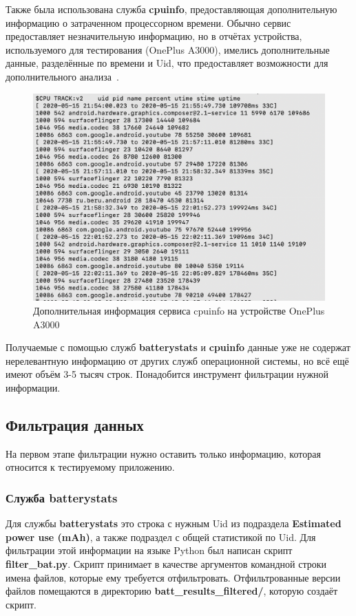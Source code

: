 \documentclass[a4paper,14pt]{extarticle} %
\begin{document}
	Также была использована служба \textbf{cpuinfo}, предоставляющая дополнительную информацию о затраченном процессорном времени. Обычно сервис предоставляет незначительную информацию, но в отчётах устройства, используемого для тестирования (OnePlus A3000), имелись дополнительные данные, разделённые по времени и Uid, что предоставляет возможности для дополнительного анализа~\ris{\ref{fig:cpuinfo}}.
	
	\begin{figure}[H]
		\includegraphics[width=\textwidth]{cpuinfo}
		\caption{Дополнительная информация сервиса cpuinfo на устройстве OnePlus A3000}
		\label{fig:cpuinfo}
	\end{figure}

	Получаемые с помощью служб \textbf{batterystats} и \textbf{cpuinfo} данные уже не содержат нерелевантную информацию от других служб операционной системы, но всё ещё имеют объём 3-5 тысяч строк. Понадобится инструмент фильтрации нужной информации.

	\subsection{Фильтрация данных}
	
	На первом этапе фильтрации нужно оставить только информацию, которая относится к тестируемому приложению. 
	
	\subsubsection{Служба batterystats}
	
	Для службы \textbf{batterystats} это строка с нужным Uid из подраздела \textbf{Estimated power use (mAh)}, а также подраздел с общей статистикой по Uid. Для фильтрации этой информации на языке Python был написан скрипт \textbf{filter\_bat.py}. Скрипт принимает в качестве аргументов командной строки имена файлов, которые ему требуется отфильтровать. Отфильтрованные версии файлов помещаются в директорию \textbf{batt\_results\_filtered/}, которую создаёт скрипт.
	
\end{document}
